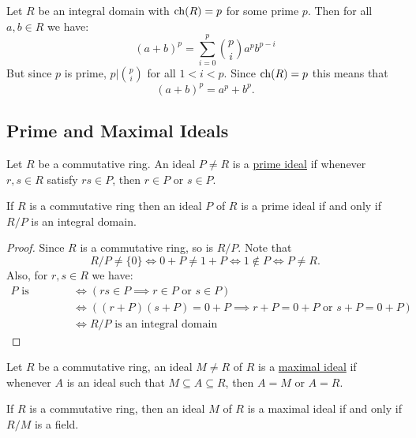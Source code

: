 \documentclass[11pt]{article}
\begin{document}
\begin{example}
    Let $R$ be an integral domain with $\operatorname{ch}(R)=p$ for some prime $p$. Then for all $a,b\in R$ we have:
    \[(a+b)^p=\sum\limits_{i=0}^p\binom{p}{i}a^pb^{p-i}\]
    But since $p$ is prime, $p|\binom{p}{i}$ for all $1<i<p$. Since $\operatorname{ch}(R)=p$ this means that
    \[(a+b)^p=a^p+b^p.\]
\end{example}

\subsection{Prime and Maximal Ideals}

\begin{definition}
    Let $R$ be a commutative ring. An ideal $P\neq R$ is a \ul{prime ideal} if whenever $r,s\in R$ satisfy $rs\in P$, then $r\in P$ or $s\in P$.
\end{definition}

\begin{proposition}
    If $R$ is a commutative ring then an ideal $P$ of $R$ is a prime ideal if and only if $R/P$ is an integral domain.
\end{proposition}

\begin{proof}
    Since $R$ is a commutative ring, so is $R/P$. Note that
    \[R/P\neq\{0\}\iff0+P\neq1+P\iff1\not\in P\iff P\neq R.\]
    Also, for $r,s\in R$ we have:
    \begin{align*}
        P\text{ is principal}&\iff(rs\in P\implies r\in P\text{ or }s\in P) \\
        &\iff((r+P)(s+P)=0+P\implies r+P=0+P\text{ or }s+P=0+P) \\
        &\iff R/P\text{ is an integral domain}
    \end{align*}
\end{proof}

\begin{definition}
    Let $R$ be a commutative ring, an ideal $M\neq R$ of $R$ is a \ul{maximal ideal} if whenever $A$ is an ideal such that $M\subseteq A\subseteq R$, then $A=M$ or $A=R$.
\end{definition}

\begin{proposition}
    If $R$ is a commutative ring, then an ideal $M$ of $R$ is a maximal ideal if and only if $R/M$ is a field.
\end{proposition}
\end{document}
